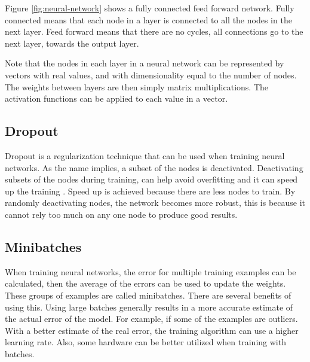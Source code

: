 Figure \ref{fig:neural-network} shows a fully connected feed forward network. Fully connected means that each node in a layer is connected to all the nodes in the next layer. Feed forward means that there are no cycles, all connections go to the next layer, towards the output layer.

Note that the nodes in each layer in a neural network can be represented by vectors with real values, and with dimensionality equal to the number of nodes. The weights between layers are then simply matrix multiplications. The activation functions can be applied to each value in a vector.

\subsection{Dropout}
Dropout is a regularization technique that can be used when training neural networks. As the name implies, a subset of the nodes is deactivated. Deactivating subsets of the nodes during training, can help avoid overfitting and it can speed up the training \cite{Srivastava:2014:DSW:2627435.2670313}. Speed up is achieved because there are less nodes to train. By randomly deactivating nodes, the network becomes more robust, this is because it cannot rely too much on any one node to produce good results.

\subsection{Minibatches}
When training neural networks, the error for multiple training examples can be calculated, then the average of the errors can be used to update the weights. These groups of examples are called minibatches. There are several benefits of using this. Using large batches generally results in a more accurate estimate of the actual error of the model. For example, if some of the examples are outliers. With a better estimate of the real error, the training algorithm can use a higher learning rate. Also, some hardware can be better utilized when training with batches. \cite{Goodfellow-et-al-2016-Book}

